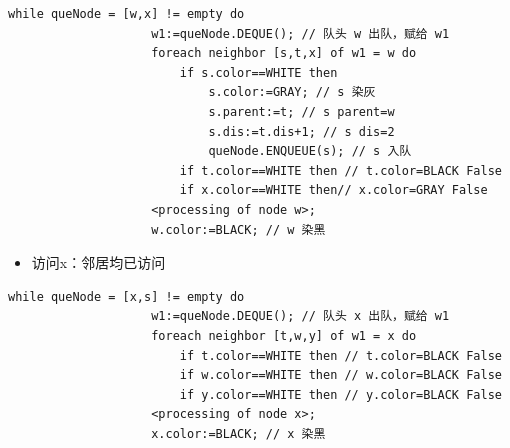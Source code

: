 \documentclass{article}
\begin{document}
\begin{enumerate}
    \begin{lstlisting}[style=algorithmPPT]
                while queNode = [w,x] != empty do
                    w1:=queNode.DEQUE(); // 队头 w 出队，赋给 w1
                    foreach neighbor [s,t,x] of w1 = w do
                        if s.color==WHITE then
                            s.color:=GRAY; // s 染灰
                            s.parent:=t; // s parent=w
                            s.dis:=t.dis+1; // s dis=2
                            queNode.ENQUEUE(s); // s 入队
                        if t.color==WHITE then // t.color=BLACK False
                        if x.color==WHITE then// x.color=GRAY False
                    <processing of node w>;
                    w.color:=BLACK; // w 染黑
                \end{lstlisting}    
    
    \begin{itemize}
        \item 访问x：邻居均已访问
    \end{itemize}

    \begin{lstlisting}[style=algorithmPPT]
                while queNode = [x,s] != empty do
                    w1:=queNode.DEQUE(); // 队头 x 出队，赋给 w1
                    foreach neighbor [t,w,y] of w1 = x do 
                        if t.color==WHITE then // t.color=BLACK False
                        if w.color==WHITE then // w.color=BLACK False
                        if y.color==WHITE then // y.color=BLACK False
                    <processing of node x>;
                    x.color:=BLACK; // x 染黑        
                \end{lstlisting}  

    \begin{figure}[htbp]
        \begin{minipage}[b]{0.6\textwidth}    %
            \centering
\end{minipage}
\end{figure}
\end{enumerate}
\end{document}
